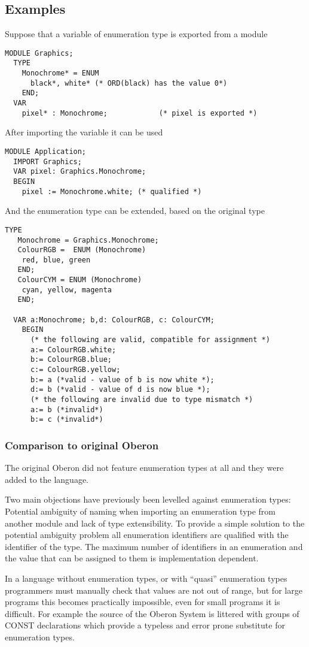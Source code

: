 \documentclass[a4wide,11pt]{article}
\begin{document}
\begin{annotation}
\subsection{Examples}

Suppose that a variable of enumeration type is exported from a module

\begin{lstlisting}[style=example]
  MODULE Graphics;
  TYPE
    Monochrome* = ENUM
      black*, white* (* ORD(black) has the value 0*)
    END;
  VAR
    pixel* : Monochrome;            (* pixel is exported *)
\end{lstlisting}

After importing the variable it can be used

\begin{lstlisting}[style=example]
  MODULE Application;
  IMPORT Graphics;
  VAR pixel: Graphics.Monochrome;
  BEGIN
    pixel := Monochrome.white; (* qualified *)
\end{lstlisting}

And the enumeration type can be extended, based on the original type

\begin{lstlisting}[style=example]
  TYPE
   Monochrome = Graphics.Monochrome;
   ColourRGB =  ENUM (Monochrome)
   	red, blue, green
   END;
   ColourCYM = ENUM (Monochrome)
   	cyan, yellow, magenta
   END;

  VAR a:Monochrome; b,d: ColourRGB, c: ColourCYM;
    BEGIN
      (* the following are valid, compatible for assignment *)
      a:= ColourRGB.white;
      b:= ColourRGB.blue;
      c:= ColourRGB.yellow;
      b:= a (*valid - value of b is now white *);
      d:= b (*valid - value of d is now blue *);
      (* the following are invalid due to type mismatch *)
      a:= b (*invalid*)
      b:= c (*invalid*)
\end{lstlisting}

\subsubsection{Comparison to original Oberon}
The original Oberon did not feature enumeration types at all and they were added to the language.

Two main objections have previously been levelled against enumeration types:
Potential ambiguity of naming when importing an enumeration type from another module and lack of type extensibility.
To provide a simple solution to the potential ambiguity problem all enumeration identifiers are qualified with the identifier of the type.
The maximum number of identifiers in an enumeration and the value that can be assigned to them is implementation dependent.

In a language without enumeration types, or with “quasi” enumeration types programmers must manually check that values are not out of range, but for large programs this becomes practically impossible, even for small programs it is difficult.
For example the source of the Oberon System is littered with groups of CONST declarations which provide a typeless and error prone substitute for enumeration types.
\end{annotation}
\end{document}
